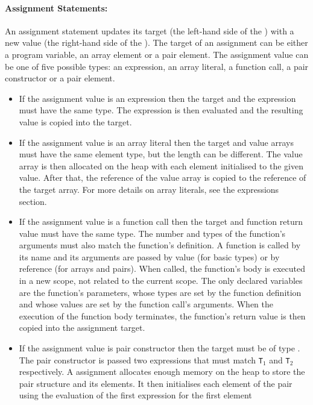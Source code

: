 \documentclass[a4paper]{article}
\theoremstyle{definition}
\begin{document}
\paragraph{Assignment Statements:}
An assignment statement updates its target (the left-hand side of the \lit{=}) with a new value (the right-hand side of the \lit{=}).
The target of an assignment can be either a program variable, an array element or a pair element.
The assignment value can be one of five possible types: an expression, an array literal, a function call, a pair constructor or a pair element.
\begin{itemize}
 \item If the assignment value is an expression  then 
       the target and the expression must have the same type.
       The expression is then evaluated and the resulting value is copied into the target.
 \item If the assignment value is an array literal  then the target and value arrays must have the same element type, 
       but the length can be different. 
       The value array is then allocated on the heap with each element initialised to the given value. After that, the reference of the value array is copied to the reference of the target array.
       For more details on array literals, see the expressions section.
 \item If the assignment value is a function call  then the target and function return value must have the same type. 
       The number and types of the function's arguments must also match the function's definition.
       A function is called by its name and its arguments are passed by value (for basic types) or by reference (for arrays and pairs).
       When called, the function's body is executed in a new scope, not related to the current scope.
       The only declared variables are the function's parameters, whose types are set by the function definition and whose values are set by the function call's arguments.
       When the execution of the function body terminates, the function's return value is then copied into the assignment target.
 \item If the assignment value is pair constructor  then the target must be of type .
       The pair constructor is passed two expressions that must match {\tt T}$_1$ and {\tt T}$_2$ respectively.
       A  assignment allocates enough memory on the heap to store the pair structure and its elements.
       It then initialises each element of the pair using the evaluation of the first expression for the first element 

\end{itemize}
\end{document}
